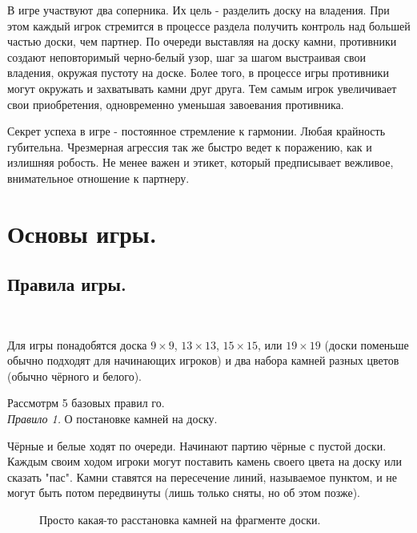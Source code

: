 \documentclass[14pt,a4paper]{extarticle}
\begin{document}
В игре участвуют два соперника. Их цель - разделить доску на владения. При этом каждый игрок стремится в процессе раздела получить контроль над большей частью доски, чем партнер. По очереди выставляя на доску камни, противники создают неповторимый черно-белый узор, шаг за шагом выстраивая свои владения, окружая пустоту на доске. Более того, в процессе игры противники могут окружать и захватывать камни друг друга. Тем самым игрок увеличивает свои приобретения, одновременно уменьшая завоевания противника.

Секрет успеха в игре - постоянное стремление к гармонии. Любая крайность губительна. Чрезмерная агрессия так же быстро ведет к поражению, как и излишняя робость. Не менее важен и этикет, который предписывает вежливое, внимательное отношение к партнеру.

\newpage

\section*{Основы игры.}

\subsection*{Правила игры.}
\

Для игры понадобятся доска $9\times9$, $13\times13$, $15\times15$, или $19\times19$ (доски поменьше обычно подходят для начинающих игроков) и два набора камней разных цветов (обычно чёрного и белого).

Рассмотрм 5 базовых правил го.
\\


\textit{Правило 1.} О постановке камней на доску.

Чёрные и белые ходят по очереди. Начинают партию чёрные с пустой доски. Каждым своим ходом игроки могут поставить камень своего цвета на доску или сказать "пас". Камни ставятся на пересечение линий, называемое пунктом, и не могут быть потом передвинуты (лишь только сняты, но об этом позже).

\begin{figure}[h]
\centering
{}
\caption{Просто какая-то расстановка камней на фрагменте доски.} \label{1}
\end{figure}
\end{document}

